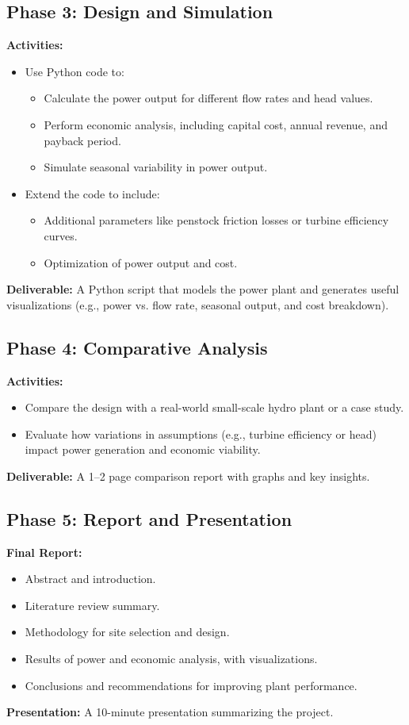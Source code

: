 \documentclass[11pt]{article}
\begin{document}
\subsection*{Phase 3: Design and Simulation}
\textbf{Activities:}
\begin{itemize}
    \item Use Python code to:
    \begin{itemize}
        \item Calculate the power output for different flow rates and head values.
        \item Perform economic analysis, including capital cost, annual revenue, and payback period.
        \item Simulate seasonal variability in power output.
    \end{itemize}
    \item Extend the code to include:
    \begin{itemize}
        \item Additional parameters like penstock friction losses or turbine efficiency curves.
        \item Optimization of power output and cost.
    \end{itemize}
\end{itemize}
\textbf{Deliverable:} A Python script that models the power plant and generates useful visualizations (e.g., power vs. flow rate, seasonal output, and cost breakdown).

\subsection*{Phase 4: Comparative Analysis}
\textbf{Activities:}
\begin{itemize}
    \item Compare the design with a real-world small-scale hydro plant or a case study.
    \item Evaluate how variations in assumptions (e.g., turbine efficiency or head) impact power generation and economic viability.
\end{itemize}
\textbf{Deliverable:} A 1--2 page comparison report with graphs and key insights.

\subsection*{Phase 5: Report and Presentation}
\textbf{Final Report:}
\begin{itemize}
    \item Abstract and introduction.
    \item Literature review summary.
    \item Methodology for site selection and design.
    \item Results of power and economic analysis, with visualizations.
    \item Conclusions and recommendations for improving plant performance.
\end{itemize}
\textbf{Presentation:} A 10-minute presentation summarizing the project.
\end{document}
